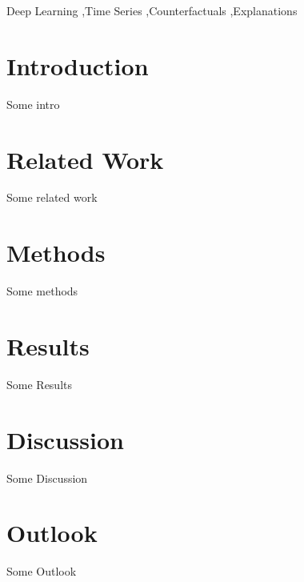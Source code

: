 \documentclass[5p,times]{elsarticle}
\begin{document}
\begin{frontmatter}


\begin{keyword}
Deep Learning \sep Time Series \sep Counterfactuals \sep Explanations
\end{keyword}

\end{frontmatter}


\section{Introduction}
\label{sec:sample1}
Some intro

\section{Related Work}
\label{sec:related-work}
Some related work

\section{Methods}
\label{sec:methods}
Some methods

\section{Results}
\label{sec:results}
Some Results

\section{Discussion}
\label{sec:discussion}
Some Discussion

\section{Outlook}
\label{sec:outlook}
Some Outlook
\end{document}
